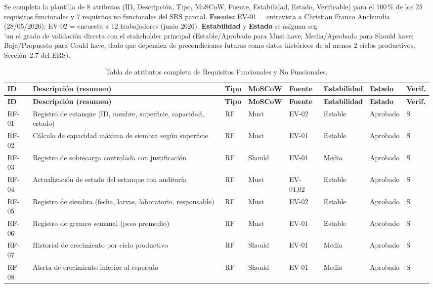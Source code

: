 \documentclass[11pt,a4paper]{report}
\begin{document}
Se completa la plantilla de 8 atributos (ID, Descripci\'on, Tipo, MoSCoW, Fuente, Estabilidad, Estado, Verificable) para el 100\,\% de los 25 requisitos funcionales y 7 requisitos no funcionales del SRS parcial. \textbf{Fuente:} EV-01 = entrevista a Christian Franco Anchundia (28/05/2026); EV-02 = encuesta a 12 trabajadores (junio 2026). \textbf{Estabilidad} y \textbf{Estado} se asignan seg\\'un el grado de validaci\'on directa con el stakeholder principal (Estable/Aprobado para Must have; Media/Aprobado para Should have; Baja/Propuesto para Could have, dado que dependen de precondiciones futuras como datos hist\'oricos de al menos 2 ciclos productivos, Secci\'on~2.7 del ERS).

{\footnotesize
\begin{longtable}{L{1.1cm}L{4.6cm}L{1.0cm}L{1.3cm}L{1.3cm}L{1.3cm}L{1.4cm}L{1.1cm}}
\caption{Tabla de atributos completa de Requisitos Funcionales y No Funcionales.}\label{tab:atributos}\\
\toprule
\textbf{ID} & \textbf{Descripci\'on (resumen)} & \textbf{Tipo} & \textbf{MoSCoW} & \textbf{Fuente} & \textbf{Estabilidad} & \textbf{Estado} & \textbf{Verif.} \\
\midrule
\endfirsthead
\toprule
\textbf{ID} & \textbf{Descripci\'on (resumen)} & \textbf{Tipo} & \textbf{MoSCoW} & \textbf{Fuente} & \textbf{Estabilidad} & \textbf{Estado} & \textbf{Verif.} \\
\midrule
\endhead
\bottomrule
\endfoot
RF-01 & Registro de estanque (ID, nombre, superficie, capacidad, estado) & RF & Must & EV-02 & Estable & Aprobado & S \\
RF-02 & C\'alculo de capacidad m\'axima de siembra seg\'un superficie & RF & Must & EV-01 & Estable & Aprobado & S \\
RF-03 & Registro de sobrecarga controlada con justificaci\'on & RF & Should & EV-01 & Media & Aprobado & S \\
RF-04 & Actualizaci\'on de estado del estanque con auditor\'ia & RF & Must & EV-01,02 & Estable & Aprobado & S \\
RF-05 & Registro de siembra (fecha, larvas, laboratorio, responsable) & RF & Must & EV-02 & Estable & Aprobado & S \\
RF-06 & Registro de grameo semanal (peso promedio) & RF & Must & EV-01 & Estable & Aprobado & S \\
RF-07 & Historial de crecimiento por ciclo productivo & RF & Should & EV-01 & Media & Aprobado & S \\
RF-08 & Alerta de crecimiento inferior al esperado & RF & Should & EV-01 & Media & Aprobado & S \\

\end{longtable}}
\end{document}
